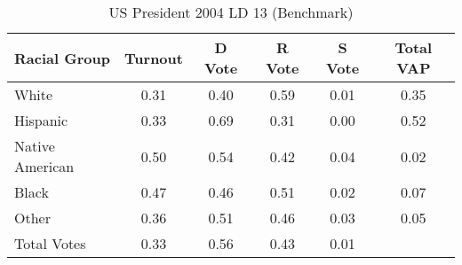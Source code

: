 \begin{table}[htb]
\begin{center}
\caption{US President 2004 LD 13 (Benchmark)}
\label{pres04_vap_ld_13_benchmark}
\begin{tabular}{lccccc}
  \hline
Racial Group & Turnout & D Vote & R Vote & S Vote & Total VAP \\ 
  \hline
White & 0.31 & 0.40 & 0.59 & 0.01 & 0.35 \\ 
  Hispanic & 0.33 & 0.69 & 0.31 & 0.00 & 0.52 \\ 
  Native American & 0.50 & 0.54 & 0.42 & 0.04 & 0.02 \\ 
  Black & 0.47 & 0.46 & 0.51 & 0.02 & 0.07 \\ 
  Other & 0.36 & 0.51 & 0.46 & 0.03 & 0.05 \\ 
  Total Votes & 0.33 & 0.56 & 0.43 & 0.01 &  \\ 
   \hline
\end{tabular}
\end{center}
\end{table}
